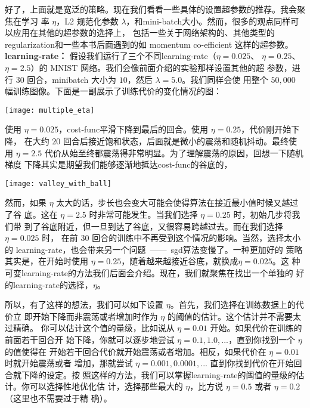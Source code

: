 好了，上面就是宽泛的策略。现在我们看看一些具体的设置超参数的推荐。我会聚焦在学习
率 $\eta$，L2 规范化参数
$\lambda$，和\gls*{mini-batch}大小。然而，很多的观点同样可以应用在其他的超参数的选择上，
包括一些关于网络架构的、其他类型的\gls*{regularization}和一些本书后面遇到的如 momentum
co-efficient 这样的超参数。\\

\textbf{\gls*{learning-rate}：} 假设我们运行了三个不同\gls*{learning-rate}（$\eta=0.025$、
  $\eta=0.25$、$\eta=2.5$）的 MNIST 网络。我们会像前面介绍的实验那样设置其他的超
参数，进行 $30$ 回合，minibatch 大小为 $10$，然后 $\lambda = 5.0$。我们同样会使
用整个 $50,000$ 幅训练图像。下面是一副展示了训练代价的变化情况的图：
\begin{center}
  \texttt{[image: multiple\_eta]}
\end{center}

使用 $\eta=0.025$，\gls*{cost-func}平滑下降到最后的回合。使用 $\eta=0.25$，代价刚开始下降，
在大约 $20$ 回合后接近饱和状态，后面就是微小的震荡和随机抖动。最终使
用 $\eta=2.5$ 代价从始至终都震荡得非常明显。为了理解震荡的原因，回想一下随机梯度
下降其实是期望我们能够逐渐地抵达\gls*{cost-func}的谷底的，
\begin{center}
  \texttt{[image: valley\_with\_ball]}
\end{center}
然而，如果 $\eta$ 太大的话，步长也会变大可能会使得算法在接近最小值时候又越过了谷
底。这在 $\eta=2.5$ 时非常可能发生。当我们选择 $\eta=0.25$ 时，初始几步将我们带
到了谷底附近，但一旦到达了谷底，又很容易跨越过去。而在我们选择 $\eta=0.025$ 时，
在前 $30$ 回合的训练中不再受到这个情况的影响。当然，选择太小的%
\gls*{learning-rate}，也会带来另一个问题~——~\gls*{sgd}算法变慢了。一种更加好的
策略其实是，在开始时使用 $\eta=0.25$，随着越来越接近谷底，就换成$\eta=0.025$。这
种可变\gls*{learning-rate}的方法我们后面会介绍。现在，我们就聚焦在找出一个单独的
好的\gls*{learning-rate}的选择，$\eta$。

所以，有了这样的想法，我们可以如下设置 $\eta$。首先，我们选择在训练数据上的代价立
即开始下降而非震荡或者增加时作为 $\eta$ 的阈值的估计。这个估计并不需要太过精确。
你可以估计这个值的量级，比如说从 $\eta=0.01$ 开始。如果代价在训练的前面若干回合开
始下降，你就可以逐步地尝试 $\eta=0.1, 1.0,...$，直到你找到一个 $\eta$ 的值使得在
开始若干回合代价就开始震荡或者增加。相反，如果代价在 $\eta=0.01$ 时就开始震荡或者
增加，那就尝试 $\eta=0.001, 0.0001,...$ 直到你找到代价在开始回合就下降的设定。按
照这样的方法，我们可以掌握\gls*{learning-rate}的阈值的量级的估计。你可以选择性地优化估
计，选择那些最大的 $\eta$，比方说 $\eta=0.5$ 或者 $\eta=0.2$（这里也不需要过于精
确）。

